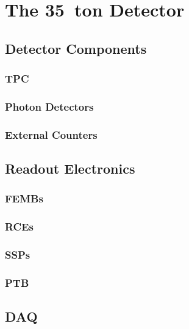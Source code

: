 \section{The 35~ton Detector}\label{sec:35tonDetector}

\subsection{Detector Components}\label{sec:35tonDetectorComponents}

\subsubsection{TPC}\label{35tonTPC}

\subsubsection{Photon Detectors}\label{35tonPhoton}

\subsubsection{External Counters}\label{35tonCounters}

\subsection{Readout Electronics}\label{sec:35tonReadoutElectronics}

\subsubsection{FEMBs}\label{35tonFEMB}

\subsubsection{RCEs}\label{35tonRCE}

\subsubsection{SSPs}\label{35tonSSP}

\subsubsection{PTB}\label{35tonPTB}

\subsection{DAQ}\label{35tonDAQ}


